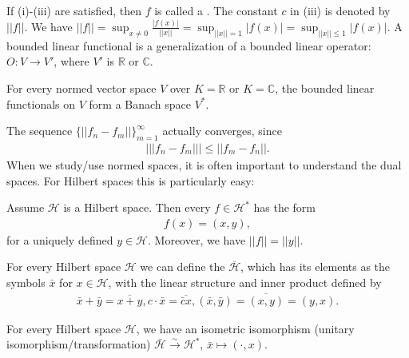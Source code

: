 If (i)-(iii) are satisfied, then \(f\) is called a . The constant \(c\) in (iii) is denoted by \(||f||\).
We have \(||f||=\sup_{x\neq0} \frac{|f(x)|}{||x||} = \sup_{||x||=1} |f(x)| = \sup_{||x||\leq 1}|f(x)|\). A bounded linear functional is a generalization of a bounded linear operator: \(O:V\rightarrow V'\), where \(V'\) is \(\mathbb{R}\) or \(\mathbb{C}\). 

\begin{proposition}
    For every normed vector space \(V\) over \(K=\mathbb{R}\) or \(K=\mathbb{C}\), the bounded linear functionals on \(V\) form a 
    Banach space \(V^*\).
\end{proposition}
\begin{remark}
    The sequence \(\{||f_n - f_m ||\}^{\infty}_{m=1}\) actually converges, since
    \begin{align*}
        \Big\vert ||f_n-f_m|| \Big\vert \leq ||f_m-f_n||.
    \end{align*}
    When we study/use normed spaces, it is often important to understand the dual spaces. For Hilbert spaces this is particularly easy:
\end{remark}
\begin{theorem}
    Assume \(\mathcal{H}\) is a Hilbert space. Then every \(f\in\mathcal{H}^*\) has the form 
    \begin{align*}
        f(x) = (x,y),
    \end{align*}
    for a uniquely defined \(y\in\mathcal{H}\). Moreover, we have \(||f||=||y||\).
\end{theorem}

For every Hilbert space \(\mathcal{H}\) we can define the  \(\overline{\mathcal{H}}\), which has its elements as 
the symbols \(\bar{x}\) for \(x\in\mathcal{H}\), with the linear structure and inner product defined by 
\begin{align*}
    \bar{x} + \bar{y} = \overline{x+y}, c\cdot \bar{x} = \overline{\bar{c}x}, (\bar{x}, \bar{y}) = \overline{(x,y)} = (y,x).
\end{align*}
\begin{corollary}
    For every Hilbert space \(\mathcal{H}\), we have an isometric isomorphism (unitary isomorphism/transformation) \(\bar{\mathcal{H}} \xrightarrow[ ]{ \sim} \mathcal{H}^*\), 
    \(\bar{x}\mapsto (\cdot, x)\).
\end{corollary}
